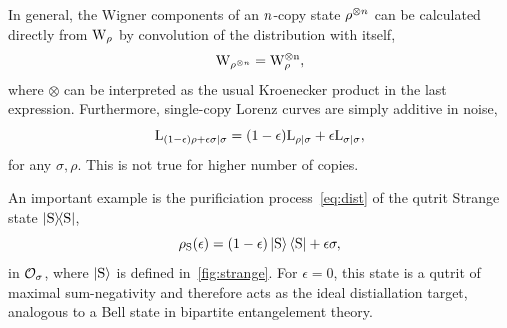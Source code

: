 \documentclass[pra,
aps,
twocolumn,
superscriptaddress,
groupedaddress,
nofootinbib,
reprint
]{revtex4-1}
\begin{document}

In general, the Wigner components of an $n$-copy state $\rho^{\otimes n}$ can be calculated directly from $\W{\rho}$ by convolution of the distribution with itself,
\begin{equation}
	\W{\rho\too{\NN}} = \rm{W}_{\rho}\too{\NN},
\end{equation}
where $\otimes$ can be interpreted as the usual Kroenecker product in the last expression.
Furthermore, single-copy Lorenz curves are simply additive in noise, 
\begin{equation}
{{\rm{L}}_{(1-\epsilon)\rho + \epsilon\sigma|\sigma}} = (1-\epsilon){{\rm{L}}_{\rho|\sigma}} + \epsilon{{\rm{L}}_{\sigma|\sigma}},
\end{equation}
for any $\sigma, \rho$.
This is not true for higher number of copies.

An important example is the purificiation process~\cref{eq:dist} of the qutrit Strange state $\ketbra{\rm{S}}$,
\begin{equation}
    \rho_{\rm{S}}(\epsilon) = (1 - \epsilon) \ket{\rm{S}}\bra{\rm{S}} + \epsilon \sigma,
\end{equation}
in $\mathcal{O}_\sigma$, where $\ket{\rm{S}}$ is defined in~\cref{fig:strange}. 
For $\epsilon=0$, this state is a qutrit of maximal sum-negativity  and therefore acts as the ideal distiallation target, analogous to a Bell state in bipartite entangelement theory.
\end{document}
